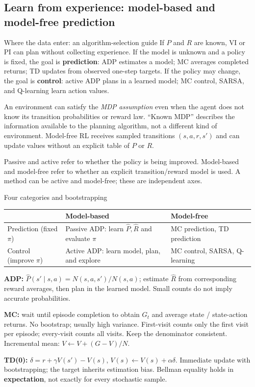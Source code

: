 \documentclass[10pt,a4paper]{article}
\begin{document}
\subsection{Learn from experience: model-based and model-free prediction}
\begin{card}{Where the data enter: an algorithm-selection guide}
If $P$ and $R$ are known, VI or PI can plan without collecting experience. If the model is unknown and a policy is fixed, the goal is \textbf{prediction}: ADP estimates a model; MC averages completed returns; TD updates from observed one-step targets. If the policy may change, the goal is \textbf{control}: active ADP plans in a learned model; MC control, SARSA, and Q-learning learn action values.

An environment can satisfy the \emph{MDP assumption} even when the agent does not know its transition probabilities or reward law. ``Known MDP'' describes the information available to the planning algorithm, not a different kind of environment. Model-free RL receives sampled transitions $(s,a,r,s')$ and can update values without an explicit table of $P$ or $R$.

Passive and active refer to whether the policy is being improved. Model-based and model-free refer to whether an explicit transition/reward model is used. A method can be active and model-free; these are independent axes.
\end{card}
\begin{card}{Four categories and bootstrapping}
\small
\par\smallskip
\begin{tabularx}{\linewidth}{@{}P{3cm}Y Y@{}}
\toprule & Model-based & Model-free \\\midrule
Prediction (fixed $\pi$) & Passive ADP: learn $\hat P,\hat R$ and evaluate $\pi$ & MC prediction, TD prediction \\
Control (improve $\pi$) & Active ADP: learn model, plan, and explore & MC control, SARSA, Q-learning \\\bottomrule
\end{tabularx}\par\smallskip
\normalsize
\textbf{ADP:} $\hat P(s'\mid s,a)=N(s,a,s')/N(s,a)$; estimate $\hat R$ from corresponding reward averages, then plan in the learned model. Small counts do not imply accurate probabilities.

\textbf{MC:} wait until episode completion to obtain $G_t$ and average state / state-action returns. No bootstrap; usually high variance. First-visit counts only the first visit per episode; every-visit counts all visits. Keep the denominator consistent. Incremental mean: $V\leftarrow V+(G-V)/N$.

\textbf{TD(0):} $\delta=r+\gamma V(s')-V(s)$, $V(s)\leftarrow V(s)+\alpha\delta$. Immediate update with bootstrapping; the target inherits estimation bias. Bellman equality holds in \textbf{expectation}, not exactly for every stochastic sample.
\end{card}
\end{document}
